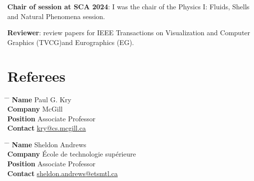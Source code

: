 \documentclass[10pt]{article} %
\begin{document}
\noindent\textbf{Chair of session at SCA 2024}:  I was the chair of the Physics I: Fluids, Shells and Natural Phenomena session.

\noindent\textbf{Reviewer}: review papers for IEEE Transactions on Visualization and Computer Graphics (TVCG)and Eurographics (EG).


\section{Referees}


\noindent\parbox{0.5\textwidth}{
\begin{tabbing}
\hspace{2.75cm} \= \hspace{4cm} \= \kill
{\bf Name} \> Paul G. Kry\\ 
{\bf Company} \> McGill\\ 
{\bf Position} \> Associate Professor \\ 
{\bf Contact} \> \href{mailto:kry@cs.mcgill.ca}{kry@cs.mcgill.ca}
\end{tabbing}}

\noindent\parbox{0.5\textwidth}{
\begin{tabbing}
\hspace{2.75cm} \= \hspace{4cm} \= \kill
{\bf Name} \> Sheldon Andrews\\ 
{\bf Company} \> École de technologie supérieure\\ 
{\bf Position} \> Associate Professor \\ 
{\bf Contact} \> \href{mailto:sheldon.andrews@etsmtl.ca}{sheldon.andrews@etsmtl.ca}
\end{tabbing}}
\end{document}

